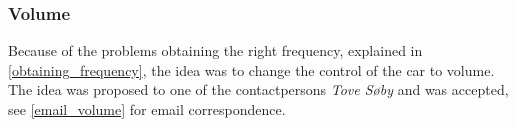 \subsubsection{Volume}
Because of the problems obtaining the right frequency, explained in \cref{obtaining_frequency}, the idea was to change the control of the car to volume.
The idea was proposed to one of the contactpersons \textit{Tove Søby} and was accepted, see \cref{email_volume} for email correspondence.